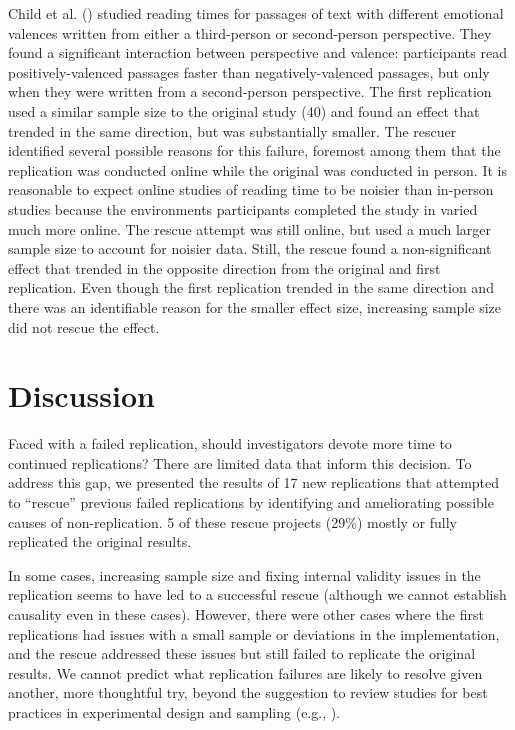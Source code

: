 \documentclass[
  english,
  a4paper,
]{article}
\begin{document}
Child et al. () studied reading times for passages of text with different emotional valences written from either a third-person or second-person perspective.
They found a significant interaction between perspective and valence: participants read positively-valenced passages faster than negatively-valenced passages, but only when they were written from a second-person perspective.
The first replication used a similar sample size to the original study (40) and found an effect that trended in the same direction, but was substantially smaller.
The rescuer identified several possible reasons for this failure, foremost among them that the replication was conducted online while the original was conducted in person.
It is reasonable to expect online studies of reading time to be noisier than in-person studies because the environments participants completed the study in varied much more online.
The rescue attempt was still online, but used a much larger sample size to account for noisier data.
Still, the rescue found a non-significant effect that trended in the opposite direction from the original and first replication.
Even though the first replication trended in the same direction and there was an identifiable reason for the smaller effect size, increasing sample size did not rescue the effect.

\section{Discussion}\label{discussion}

Faced with a failed replication, should investigators devote more time to continued replications?
There are limited data that inform this decision.
To address this gap, we presented the results of 17 new replications that attempted to ``rescue'' previous failed replications by identifying and ameliorating possible causes of non-replication.
5 of these rescue projects (29\%) mostly or fully replicated the original results.

In some cases, increasing sample size and fixing internal validity issues in the replication seems to have led to a successful rescue (although we cannot establish causality even in these cases).
However, there were other cases where the first replications had issues with a small sample or deviations in the implementation, and the rescue addressed these issues but still failed to replicate the original results.
We cannot predict what replication failures are likely to resolve given another, more thoughtful try, beyond the suggestion to review studies for best practices in experimental design and sampling (e.g., ).
\end{document}
